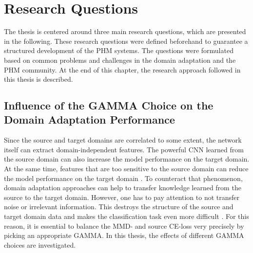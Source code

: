 \chapter{Research Questions}\label{chapter:research_approach}
The thesis is centered around three main research questions, which are presented in the following. These research questions were defined beforehand to guarantee a structured development of the PHM systems. The questions were formulated based on common problems and challenges in the domain adaptation and the PHM community. At the end of this chapter, the research approach followed in this thesis is described.

\section{Influence of the GAMMA Choice on the Domain Adaptation Performance}
Since the source and target domains are correlated to some extent, the network itself can extract domain-independent features. The powerful CNN learned from the source domain can also increase the model performance on the target domain. At the same time, features that are too sensitive to the source domain can reduce the model performance on the target domain \cite{li2020}. To counteract that phenomenon, domain adaptation approaches can help to transfer knowledge learned from the source to the target domain. However, one has to pay attention to not transfer noise or irrelevant information. This destroys the structure of the source and target domain data and makes the classification task even more difficult \cite{li2020}. For this reason, it is essential to balance the MMD- and source CE-loss very precisely by picking an appropriate GAMMA. In this thesis, the effects of different GAMMA choices are investigated.

